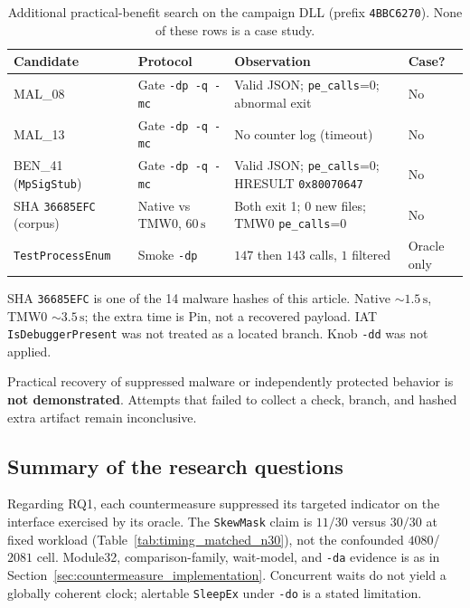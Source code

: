\documentclass[pdflatex,sn-mathphys-num]{sn-jnl}
\theoremstyle{thmstyleone}
\theoremstyle{thmstyletwo}
\theoremstyle{thmstylethree}
\begin{document}
\begin{table}[t]
\caption{Additional practical-benefit search on the campaign DLL (prefix \texttt{4BBC6270}). None of these rows is a case study.}
\label{tab:extra_search}
\centering
\small
\begin{tabular}{llll}
\toprule
\textbf{Candidate} & \textbf{Protocol} & \textbf{Observation} & \textbf{Case?} \\
\midrule
MAL\_08 & Gate \texttt{-dp -q -mc} & Valid JSON; \texttt{pe\_calls}=0; abnormal exit & No \\
MAL\_13 & Gate \texttt{-dp -q -mc} & No counter log (timeout) & No \\
BEN\_41 (\texttt{MpSigStub}) & Gate \texttt{-dp -q -mc} & Valid JSON; \texttt{pe\_calls}=0; HRESULT \texttt{0x80070647} & No \\
SHA \texttt{36685EFC} (corpus) & Native vs TMW0, $60\,\mathrm{s}$ & Both exit 1; $0$ new files; TMW0 \texttt{pe\_calls}=0 & No \\
\texttt{TestProcessEnum} & Smoke \texttt{-dp} & $147$ then $143$ calls, $1$ filtered & Oracle only \\
\bottomrule
\end{tabular}
\vspace{3pt}
\parbox{\textwidth}{\footnotesize SHA \texttt{36685EFC} is one of the 14 malware hashes of this article. Native $\sim 1.5\,\mathrm{s}$, TMW0 $\sim 3.5\,\mathrm{s}$; the extra time is Pin, not a recovered payload. IAT \texttt{IsDebuggerPresent} was not treated as a located branch. Knob \texttt{-dd} was not applied.}
\end{table}

Practical recovery of suppressed malware or independently protected behavior is \textbf{not demonstrated}. Attempts that failed to collect a check, branch, and hashed extra artifact remain inconclusive.

\subsection{Summary of the research questions}
\label{subsec:rq_summary}

Regarding RQ1, each countermeasure suppressed its targeted indicator on the interface exercised by its oracle. The \texttt{SkewMask} claim is $11/30$ versus $30/30$ at fixed workload (Table~\ref{tab:timing_matched_n30}), not the confounded $4080$/$2081$ cell. Module32, comparison-family, wait-model, and \texttt{-da} evidence is as in Section~\ref{sec:countermeasure_implementation}. Concurrent waits do not yield a globally coherent clock; alertable \texttt{SleepEx} under \texttt{-do} is a stated limitation.
\end{document}
